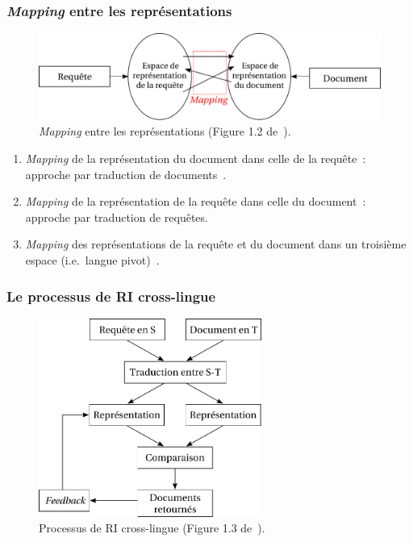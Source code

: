 \documentclass[11pt,aspectratio=43,dvipsnames,table]{beamer}
\begin{document}
\begin{frame}
    \frametitle{\textit{Mapping} entre les représentations}
    \begin{figure}
    \centering
    \includegraphics[width=1\textwidth]{img/mapping.pdf}
    \caption{\textit{Mapping} entre les représentations 
            (Figure 1.2 de~\cite{DBLP:series/synthesis/2010Nie}).}
    \end{figure}
    \vspace*{-1em}
    \begin{enumerate} 
        \item \textit{Mapping} de la représentation du document dans celle de la
              requête~: approche par traduction de documents~\cite{oard1997}.
        \item \textit{Mapping} de la représentation de la requête dans celle du 
              document~: approche par traduction de requêtes.
        \item \textit{Mapping} des représentations de la requête et du document
              dans un troisième espace 
              (i.e.~langue pivot)~\cite{ruiz1999,Kishida:2005}.
    \end{enumerate}
\end{frame}


\begin{frame}
    \frametitle{Le processus de RI cross-lingue}
    \begin{figure}
    \centering
    \includegraphics[width=0.65\textwidth]{img/typicalCLIR.pdf}
    \caption{Processus de RI cross-lingue (Figure 1.3 
             de~\cite{DBLP:series/synthesis/2010Nie}).}
    \end{figure}
\end{frame}
\end{document}
